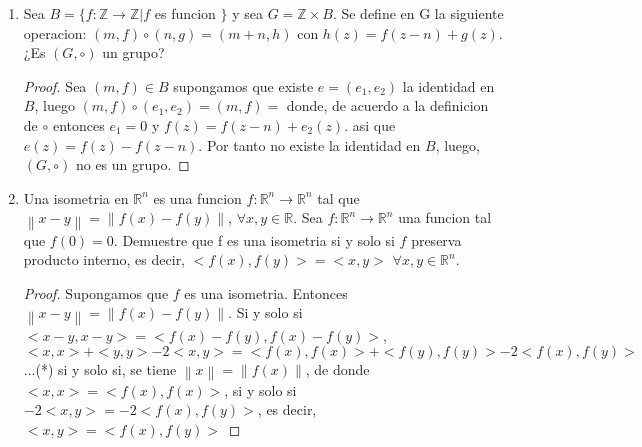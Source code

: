 \documentclass{article}
\theoremstyle{break}
\begin{document}
\begin{enumerate}
\begin{proof}
\begin{itemize}
					Definimos la identidad en G como  $(0,0)$. Sea $(a,b)\in G$, entonces $(a,b)\circ(0,0)=(a+0,2^0b+0)=(a,b)=(0+a,2^a0+b)=(0,0)\circ(a,b)$.
					
				\item Asociatividad.
				
				$((a,b)\circ(c,d))\circ(g,f)=((a+c)+g, 2^g(2^c b+d)+f)=(a+(c+g), 2^{c+g} b+2^g d+f)=(a,b)\circ(c+g,2^g d+f)=(a,b)\circ((c,d)\circ(g,f))$.
				
				\item Existencia del inverso
				
				Sea $(a,b)\in G $ entonces definimos el inverso como $(a,b)^{-1}=(-a, -2^{-a}b)$. Luego $(a,b)\circ(a,b)^{-1}=(a,b)\circ(-a,-2^{-a}b)=(a+(-a), 2^{-a}b+(-2^{-a}b))=(0,0)=((-a)+a,(-2^{-a}b)+2^{-a}b)=(a,b)\circ(-a,-2^{-a}b)=(a,b)\circ(a,b)^{-1}$.
				
			\end{itemize}
			
		\end{proof}
		
		\item Sea $B=\{f: \mathbb{Z}\rightarrow\mathbb{Z} | f$ es funcion $\}$ y sea $G=\mathbb{Z}\times B$. Se define en G la siguiente operacion: $(m,f)\circ(n,g)=(m+n,h)$ con $h(z)=f(z-n)+g(z)$. ¿Es $(G,\circ)$ un grupo?
		
		\begin{proof}
			Sea $(m,f)\in B$ supongamos que existe $e=(e_1,e_2)$ la identidad en $B$, luego $(m,f)\circ(e_1,e_2)=(m,f)=$ donde, de acuerdo a la definicion de $\circ$ entonces $e_1=0$ y $f(z)=f(z-n)+e_2(z)$. asi que $ e(z)=f(z)-f(z-n)$. Por tanto no existe la identidad en $B$, luego, $(G,\circ)$ no es un grupo.
		\end{proof}
		
		\item Una isometria en $\mathbb{R}^{n}$ es una funcion $f:\mathbb{R}^{n}\rightarrow \mathbb{R}^{n}$ tal que $\left\|x-y\right\|=\left\|f(x)-f(y)\right\|$, $\forall x,y\in \mathbb{R}$. Sea $f:\mathbb{R}^{n}\rightarrow \mathbb{R}^{n}$ una funcion tal que $f(0)=0$. Demuestre que f es una isometria si y solo si $f$ preserva producto interno, es decir, $<f(x),f(y)>=<x,y>$ $\forall x,y\in \mathbb{R}^n$.
		
			\begin{proof}
				
					 Supongamos que $f$ es una isometria. Entonces $\left\|x-y\right\|=\left\|f(x)-f(y)\right\|$. Si y solo si $<x-y,x-y>=<f(x)-f(y), f(x)-f(y)>$, $<x,x>+<y,y>-2<x,y>=<f(x),f(x)>+<f(y),f(y)>-2<f(x),f(y)>$...(*) si y solo si, se tiene $\left\|x\right\|=\left\|f(x)\right\|$, de donde $<x,x>=<f(x),f(x)>$, si y solo si $-2<x,y>=-2<f(x),f(y)>$, es decir, $<x,y>=<f(x),f(y)>$
					

\end{proof}
\end{enumerate}
\end{document}
